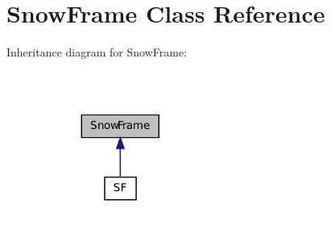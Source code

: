 \hypertarget{classSnowFrame}{
\section{SnowFrame Class Reference}
\label{classSnowFrame}
}


Inheritance diagram for SnowFrame:\nopagebreak
\begin{figure}[H]
\begin{center}
\leavevmode
\includegraphics[width=152pt]{classSnowFrame__inherit__graph}
\end{center}
\end{figure}
